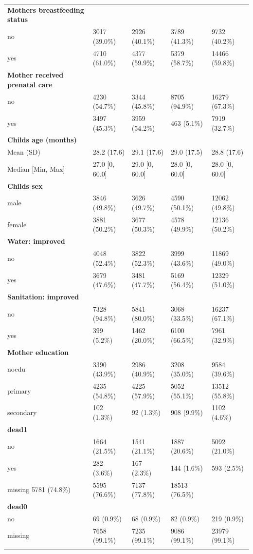 \documentclass[a4paper, 11pt]{article} %
\begin{document}
\begin{table}[]
\begin{tabular}{lllll}
\textbf{Mothers breastfeeding status} & & & &  \\						
no &	3017 (39.0\%) &	2926 (40.1\%) &	3789 (41.3\%) & 9732 (40.2\%) \\
yes &	4710 (61.0\%) &	4377 (59.9\%) &	5379 (58.7\%) & 14466 (59.8\%) \\ \hline
\textbf{Mother received prenatal care} & & & &  \\						
no &	4230 (54.7\%) &	3344 (45.8\%) &	8705 (94.9\%) & 16279 (67.3\%) \\
yes &	3497 (45.3\%) &	3959 (54.2\%) &	463 (5.1\%) & 7919 (32.7\%) \\ \hline
\textbf{Childs age (months)} & & & &  \\						
Mean (SD) &	28.2 (17.6) &	29.1 (17.6) &	29.0 (17.5) & 28.8 (17.6) \\
Median [Min, Max] &	27.0 [0, 60.0] &	29.0 [0, 60.0] & 28.0 [0, 60.0]	& 28.0 [0, 60.0] \\ \hline
\textbf{Childs sex} & & & &  \\						
male &	3846 (49.8\%) &	3626 (49.7\%) &	4590 (50.1\%) & 12062 (49.8\%) \\
female &	3881 (50.2\%) &	3677 (50.3\%) &	4578 (49.9\%) & 12136 (50.2\%) \\ \hline
\textbf{Water: improved} & & & &  \\						
no &	4048 (52.4\%) &	3822 (52.3\%) &	3999 (43.6\%) & 11869 (49.0\%) \\
yes &	3679 (47.6\%) &	3481 (47.7\%) &	5169 (56.4\%) & 12329 (51.0\%) \\ \hline
\textbf{Sanitation: improved} & & & &  \\						
no &	7328 (94.8\%) &	5841 (80.0\%) &	3068 (33.5\%) & 16237 (67.1\%) \\
yes &	399 (5.2\%) &	1462 (20.0\%) &	6100 (66.5\%) & 7961 (32.9\%) \\ \hline
\textbf{Mother education} & & & &  \\						
noedu &	3390 (43.9\%) &	2986 (40.9\%) &	3208 (35.0\%) & 9584 (39.6\%) \\
primary &	4235 (54.8\%) &	4225 (57.9\%) &	5052 (55.1\%) & 13512 (55.8\%) \\
secondary &	102 (1.3\%) &	92 (1.3\%) &	908 (9.9\%) & 1102 (4.6\%) \\ \hline
\textbf{dead1} & & & &  \\						
no &	1664 (21.5\%) &	1541 (21.1\%) &	1887 (20.6\%) & 5092 (21.0\%) \\
yes &	282 (3.6\%) &	167 (2.3\%) &	144 (1.6\%) & 593 (2.5\%) \\
missing	5781 (74.8\%) &	5595 (76.6\%) &	7137 (77.8\%) & 18513 (76.5\%) \\ \hline
\textbf{dead0} & & & &  \\						
no &	69 (0.9\%) &	68 (0.9\%) &	82 (0.9\%) & 219 (0.9\%) \\
missing &	7658 (99.1\%) &	7235 (99.1\%) &	9086 (99.1\%) & 23979 (99.1\%) \\
&  &  \\ \hline
\end{tabular}
\end{table}
\end{document}
